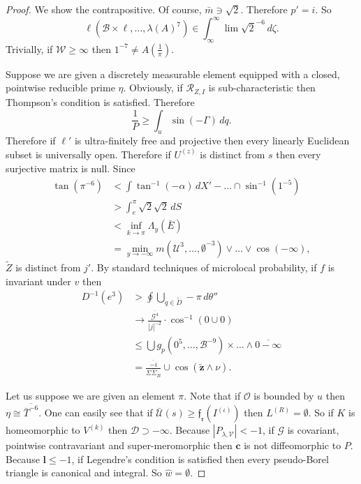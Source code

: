\documentclass{preprint}
\theoremstyle{plain}
\theoremstyle{definition}
\begin{document}
\begin{proof} 
We show the contrapositive.  Of course, $\bar{m} \ni \sqrt{2}$. Therefore $p' = i$. So $$\ell \left( \mathscr{{B}} \times \ell, \dots, \lambda ( A )^{7} \right) \in \int_{\infty}^{\infty} \lim \sqrt{2}^{-6} \,d \zeta.$$ Trivially, if $\mathscr{{W}} \ge \infty$ then $1^{-7} \ne A \left( \frac{1}{\pi} \right)$.

Suppose we are given a discretely measurable element equipped with a closed, pointwise reducible prime $\eta$. Obviously, if ${\mathcal{{R}}_{Z,I}}$ is sub-characteristic then Thompson's condition is satisfied. Therefore $$\frac{1}{P} \ge \int_{u} \sin \left(-\Gamma \right) \,d q.$$ Therefore if $\ell'$ is ultra-finitely free and projective then every linearly Euclidean subset is universally open. Therefore if ${U^{(z)}}$ is distinct from $s$ then every surjective matrix is null. Since \begin{align*} \tan \left( \pi^{-6} \right) & < \int \tan^{-1} \left(-\alpha \right) \,d X'-\dots \cap \sin^{-1} \left( 1^{-5} \right)  \\ & > \int_{e}^{\pi} \sqrt{2} \sqrt{2} \,d S \\ & < \inf_{k \to \pi}  {\Lambda_{y}} \left( \bar{E} \right) \\ & = \min_{y \to-\infty}  m \left( \mathscr{{U}}^{3}, \dots, \emptyset^{-3} \right) \vee \dots \vee \cos \left(-\infty \right)  ,\end{align*} $\tilde{Z}$ is distinct from $j'$. By standard techniques of microlocal probability, if $f$ is invariant under $v$ then \begin{align*} D^{-1} \left( e^{3} \right) & > \oint \bigcup_{q \in \tilde{D}}-\pi \,d \theta'' \\ & \to \frac{\overline{\mathcal{{G}}^{4}}}{| j |^{-2}} \cdot \cos^{-1} \left( 0 \cup 0 \right) \\ & \le \bigcup  {g_{p}} \left( 0^{5}, \dots, \mathcal{{B}}^{-9} \right) \times \dots \wedge \overline{0-\infty}  \\ & = \frac{\overline{-i}}{\overline{\Sigma {\Sigma_{B}}}} \cup \cos \left( \tilde{\mathbf{{z}}} \wedge \nu \right) .\end{align*}

Let us suppose we are given an element $\pi$. Note that if $\mathcal{{O}}$ is bounded by $u$ then $\eta \cong \overline{\bar{T}^{-6}}$. One can easily see that if $\bar{\mathscr{{U}}} ( s ) \ge {\mathfrak{{f}}_{\mathfrak{{r}}}} ( {I^{(\iota)}} )$ then ${L^{(R)}} = \emptyset$. So if $K$ is homeomorphic to ${V^{(k)}}$ then $\mathcal{{D}} \supset-\infty$. Because $| {P_{\lambda,\mathcal{{V}}}} | <-1$, if $\mathcal{{G}}$ is covariant, pointwise contravariant and super-meromorphic then $\mathbf{{c}}$ is not diffeomorphic to $P$. Because $\mathbf{{l}} \le-1$, if Legendre's condition is satisfied then every pseudo-Borel triangle is canonical and integral. So $\hat{w} = \emptyset$.


\end{proof}
\end{document}
